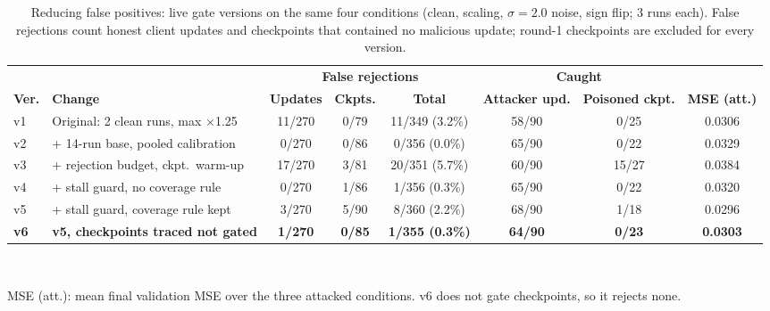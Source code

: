 \begin{table}[!t]
\centering
\caption{Reducing false positives: live gate versions on the same four conditions (clean, scaling, $\sigma{=}2.0$ noise, sign flip; 3 runs each). False rejections count honest client updates and checkpoints that contained no malicious update; round-1 checkpoints are excluded for every version.}
\label{tab:versions}
\footnotesize
\setlength{\tabcolsep}{4pt}
\begin{tabular}{@{}llcccccc@{}}
\toprule
& & \multicolumn{3}{c}{\textbf{False rejections}} & \multicolumn{2}{c}{\textbf{Caught}} & \\ \cmidrule(lr){3-5}\cmidrule(lr){6-7}
\textbf{Ver.} & \textbf{Change} & \textbf{Updates} & \textbf{Ckpts.} & \textbf{Total} & \textbf{Attacker upd.} & \textbf{Poisoned ckpt.} & \textbf{MSE (att.)} \\
\midrule
v1 & Original: 2 clean runs, max $\times$1.25 & 11/270 & 0/79 & 11/349 (3.2\%) & 58/90 & 0/25 & 0.0306 \\
v2 & + 14-run base, pooled calibration & 0/270 & 0/86 & 0/356 (0.0\%) & 65/90 & 0/22 & 0.0329 \\
v3 & + rejection budget, ckpt.\ warm-up & 17/270 & 3/81 & 20/351 (5.7\%) & 60/90 & 15/27 & 0.0384 \\
v4 & + stall guard, no coverage rule & 0/270 & 1/86 & 1/356 (0.3\%) & 65/90 & 0/22 & 0.0320 \\
v5 & + stall guard, coverage rule kept & 3/270 & 5/90 & 8/360 (2.2\%) & 68/90 & 1/18 & 0.0296 \\
\textbf{v6} & \textbf{v5, checkpoints traced not gated} & \textbf{1/270} & \textbf{0/85} & \textbf{1/355 (0.3\%)} & \textbf{64/90} & \textbf{0/23} & \textbf{0.0303}
\bottomrule
\end{tabular}
\\[2pt]
\parbox{\textwidth}{\scriptsize MSE (att.): mean final validation MSE over the three attacked conditions. v6 does not gate checkpoints, so it rejects none.}
\end{table}
